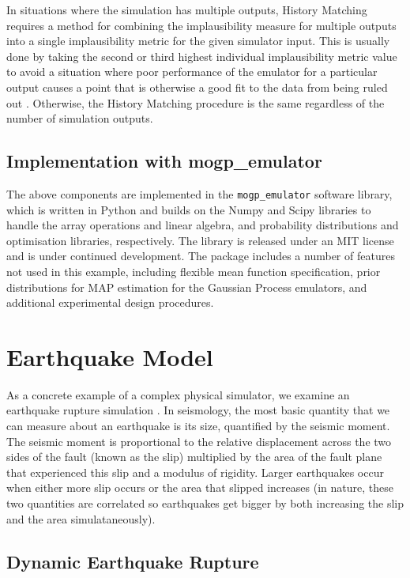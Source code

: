 \documentclass[openacc]{rstransa}%
\begin{document}
In situations where the simulation has multiple outputs, History Matching
requires a method for combining the implausibility measure for multiple
outputs into a single implausibility metric for the given simulator input.
This is usually done by taking the second or third highest individual
implausibility metric value to avoid a situation where poor performance of
the emulator for a particular output causes a point that is otherwise a
good fit to the data from being ruled out \cite{vernon2014}. Otherwise,
the History Matching procedure is the same regardless of the number of
simulation outputs.

\subsection{Implementation with mogp\_emulator}

The above components are implemented in the \texttt{mogp\_emulator} software library, which is
written in Python and builds on the Numpy and Scipy libraries \cite{scipy} to handle the array operations and
linear algebra, and probability distributions and optimisation libraries, respectively. The
library is released under an MIT license and is under continued development. The
package includes a number of features not used in this example, including flexible mean function
specification, prior distributions for MAP estimation for the Gaussian Process emulators, and additional
experimental design procedures.

\section{Earthquake Model}

As a concrete example of a complex physical simulator, we examine an earthquake rupture simulation
\cite{earthquakedynamics,daubcarlson}.
In seismology, the most basic quantity that we can measure about an earthquake is its size,
quantified by the seismic moment. The seismic moment is proportional to the relative displacement across the
two sides of the fault (known as the slip) multiplied by the area of the fault plane that experienced this slip
and a modulus of rigidity. Larger earthquakes occur when either more slip occurs or the area that slipped
increases (in nature, these two quantities are correlated so earthquakes get bigger by both increasing the slip
and the area simulataneously).

\subsection{Dynamic Earthquake Rupture}
\end{document}
